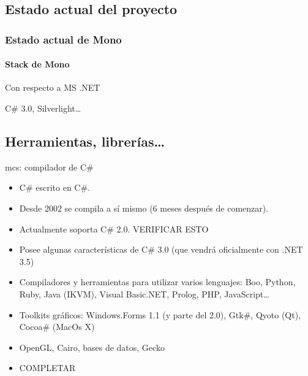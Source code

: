 \documentclass{beamer}
\begin{document}
\subsection{Estado actual del proyecto}

\begin{frame}[plain]
  \frametitle{Estado actual de Mono}
  \framesubtitle{Stack de Mono}

  \begin{centering}
  \end{centering}
\end{frame}

\begin{frame}[plain]{Con respecto a MS .NET}
  \begin{centering}
  \end{centering}

  \vspace{2ex}
  C\# 3.0, Silverlight\ldots
\end{frame}


\subsection{Herramientas, librerías\ldots}

\begin{frame}{mcs: compilador de C\#}
  \begin{itemize}
    \item C\# escrito en C\#.
    \item Desde 2002 se compila a sí mismo (6 meses después de comenzar).
    \item Actualmente soporta C\# 2.0. VERIFICAR ESTO
    \item Posee algunas características de C\# 3.0 (que vendrá oficialmente con .NET 3.5)
  \end{itemize}
\end{frame}

\begin{frame}
  \begin{itemize}
    \item Compiladores y herramientas para utilizar varios lenguajes: Boo,
      Python, Ruby, Java (\alert{IKVM}), Visual Basic.NET, Prolog, PHP, JavaScript\ldots
    \item Toolkits gráficos: Windows.Forms 1.1 (y parte del 2.0), Gtk\#, Qyoto (Qt), Cocoa\# (MacOs X)
    \item OpenGL, Cairo, bases de datos, Gecko
    \item COMPLETAR
  \end{itemize}
\end{frame}
\end{document}
